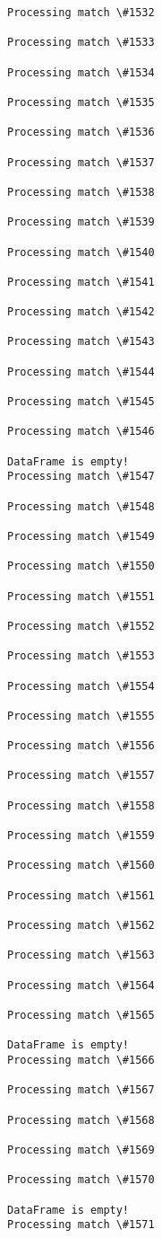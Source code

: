 \documentclass[11pt]{article}
\begin{document}
\begin{Verbatim}[commandchars=\\\{\}]
Processing match \#1532

Processing match \#1533

Processing match \#1534

Processing match \#1535

Processing match \#1536

Processing match \#1537

Processing match \#1538

Processing match \#1539

Processing match \#1540

Processing match \#1541

Processing match \#1542

Processing match \#1543

Processing match \#1544

Processing match \#1545

Processing match \#1546

DataFrame is empty!
Processing match \#1547

Processing match \#1548

Processing match \#1549

Processing match \#1550

Processing match \#1551

Processing match \#1552

Processing match \#1553

Processing match \#1554

Processing match \#1555

Processing match \#1556

Processing match \#1557

Processing match \#1558

Processing match \#1559

Processing match \#1560

Processing match \#1561

Processing match \#1562

Processing match \#1563

Processing match \#1564

Processing match \#1565

DataFrame is empty!
Processing match \#1566

Processing match \#1567

Processing match \#1568

Processing match \#1569

Processing match \#1570

DataFrame is empty!
Processing match \#1571


\end{Verbatim}
\end{document}
